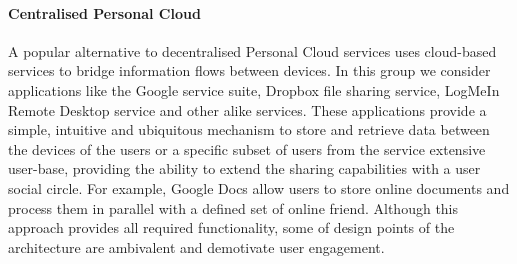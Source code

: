 \paragraph*{Centralised Personal Cloud}

A popular alternative to decentralised Personal Cloud services uses cloud-based
services to bridge information flows between devices.  In this group we consider
applications like the Google service suite, Dropbox file sharing service,
LogMeIn Remote Desktop service and other alike services.  These applications
provide a simple, intuitive and ubiquitous mechanism to store and retrieve data
between the devices of the users or a specific subset of users from the service
extensive user-base, providing the ability to extend the sharing capabilities
with a user social circle. For example, Google Docs allow users to store online
documents and process them in parallel with a defined set of online friend.
Although this approach provides all required functionality, some of design
points of the architecture are ambivalent and demotivate user engagement. 

